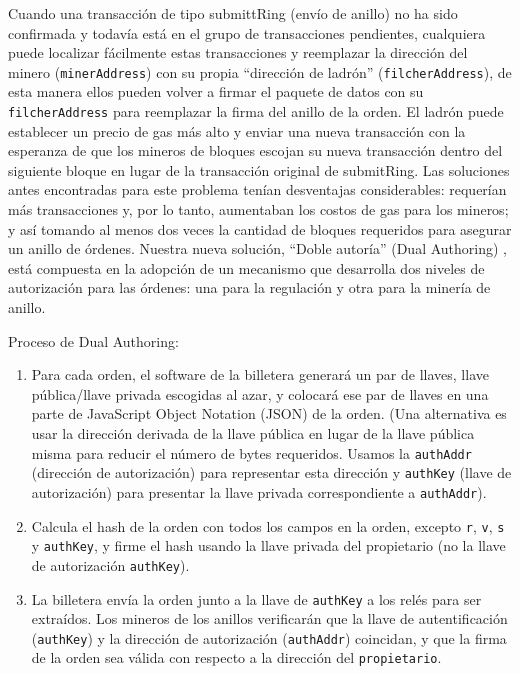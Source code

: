 \documentclass[UTF8,nofonts]{article}
\begin{document}
\begin{multicols}{2}
Cuando una transacci\'on de tipo submittRing (env\'io de anillo) no ha sido confirmada y todav\'ia est\'a en el grupo de transacciones pendientes, cualquiera puede localizar f\'acilmente estas transacciones y reemplazar la direcci\'on del minero (\verb|minerAddress|) con su propia \enquote{direcci\'on de ladr\'on} (\verb|filcherAddress|), de esta manera ellos pueden volver a firmar el paquete de datos con su \verb|filcherAddress| para reemplazar la firma del anillo de la orden. El ladr\'on puede establecer un precio de gas m\'as alto y enviar una nueva transacci\'on con la esperanza de que los mineros de bloques escojan su nueva transacci\'on dentro del siguiente bloque en lugar de la transacci\'on original de submitRing.
Las soluciones antes encontradas para este problema ten\'ian desventajas considerables: requer\'ian m\'as transacciones y, por lo tanto, aumentaban los costos de gas para los mineros; y as\'i tomando al menos dos veces la cantidad de bloques requeridos para asegurar un anillo de \'ordenes. Nuestra nueva soluci\'on, \enquote{Doble autor\'ia} (Dual Authoring) \cite{dualauthor}, est\'a compuesta en la adopci\'on de un mecanismo que desarrolla dos niveles de autorizaci\'on para las \'ordenes: una para la regulaci\'on y otra para la miner\'ia de anillo. 


Proceso de Dual Authoring:
\begin{enumerate}
	\item Para cada orden, el software de la billetera generar\'a un par de llaves, llave p\'ublica/llave privada escogidas al azar, y colocar\'a ese par de llaves en una parte de JavaScript Object Notation (JSON) de la orden. (Una alternativa es usar la direcci\'on derivada de la llave p\'ublica en lugar de la llave p\'ublica misma para reducir el n\'umero de bytes requeridos. Usamos la \verb|authAddr| (direcci\'on de autorizaci\'on) para representar esta direcci\'on y \verb|authKey| (llave de autorizaci\'on) para presentar la llave privada correspondiente a \verb|authAddr|).
    \item Calcula el hash de la orden con todos los campos en la orden, excepto \verb|r|, \verb|v|, \verb|s| y \verb|authKey|, y firme el hash usando la llave privada del propietario (no la llave de autorizaci\'on \verb|authKey|).

    \item La billetera env\'ia la orden junto a la llave de \verb|authKey| a los rel\'es para ser extra\'idos. Los mineros de los anillos verificar\'an que la llave de autentificaci\'on (\verb|authKey|) y la direcci\'on de autorizaci\'on (\verb|authAddr|) coincidan, y que la firma de la orden sea v\'alida con respecto a la direcci\'on del \verb|propietario|. %



\end{enumerate}
\end{multicols}
\end{document}
